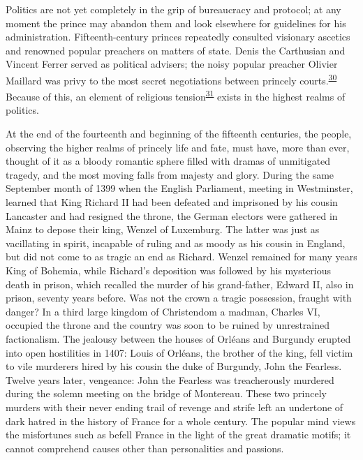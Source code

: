 Politics are not yet completely in the grip of bureaucracy and protocol;
at any moment the prince may abandon them and look elsewhere for
guidelines for his administration. Fifteenth-century princes repeatedly
consulted visionary ascetics and renowned popular preachers on matters
of state. Denis the Carthusian and Vincent Ferrer served as political
advisers; the noisy popular preacher Olivier Maillard was privy to the
most secret negotiations between princely
courts.\textsuperscript{\protect\hypertarget{08_Chapter_One__THE_PASSIONATE_INTE.xhtmlux5cux23id_2171}{\protect\hyperlink{23_NOTES.xhtmlux5cux23id_2172}{30}}}
Because of this, an element of religious
tension\textsuperscript{\protect\hypertarget{08_Chapter_One__THE_PASSIONATE_INTE.xhtmlux5cux23id_2169}{\protect\hyperlink{23_NOTES.xhtmlux5cux23id_2170}{31}}}
exists in the highest realms of politics.

At the end of the fourteenth and beginning of the fifteenth centuries,
the people, observing the higher realms of princely life and fate, must
have, more than ever, thought of it as a bloody romantic sphere filled
with dramas of unmitigated tragedy, and the most moving falls from
majesty and glory. During the same September month of 1399 when the
English Parliament, meeting in Westminster, learned that King Richard II
had been defeated and imprisoned by his cousin Lancaster and had
resigned the throne, the German electors were gathered in Mainz to
depose their king, Wenzel of Luxemburg. The latter was just as
vacillating in spirit, incapable of ruling and as moody as his cousin in
England, but did not come to as tragic an end as Richard. Wenzel
remained for many years King of Bohemia, while Richard's deposition was
followed by his mysterious death in prison, which recalled the murder of
his grand-father, Edward II, also in prison, seventy years before. Was
not the crown a tragic possession, fraught with danger? In a third large
kingdom of Christendom a madman, Charles VI, occupied the throne and the
country was soon to be ruined by unrestrained factionalism. The jealousy
between the houses of Orléans and Burgundy erupted into open hostilities
in 1407: Louis of Orléans, the brother of the king, fell victim to vile
murderers hired by his cousin the duke of Burgundy, John the Fearless.
Twelve years later, vengeance: John the Fearless was treacherously
murdered during the solemn meeting on the bridge of Montereau. These two
princely murders with their never ending trail of revenge and strife
left an undertone of dark hatred in the history of France for a whole
century. The popular mind views the misfortunes such as befell France
\protect\hypertarget{08_Chapter_One__THE_PASSIONATE_INTE.xhtmlux5cux23page_13}{}{}in
the light of the great dramatic motifs; it cannot comprehend causes
other than personalities and passions.

